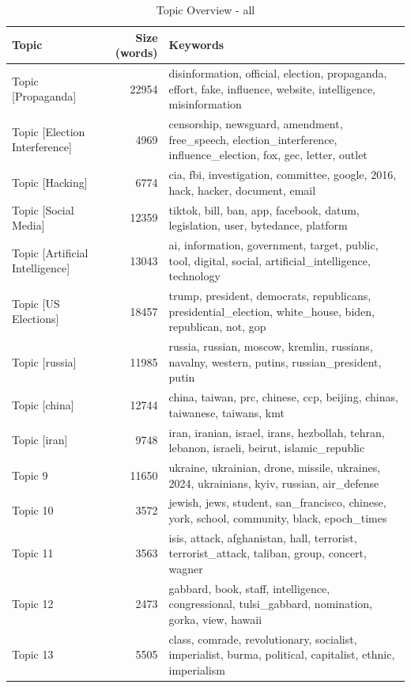 \begin{table}
\centering
\small
\caption{Topic Overview - all}
\label{tab:topic_overview_all}
\begin{tabular}{lrp{8cm}}
\toprule
Topic & Size (words) & Keywords \\
\midrule
Topic [Propaganda] & 22954 & disinformation, official, election, propaganda, effort, fake, influence, website, intelligence, misinformation \\
Topic [Election Interference] & 4969 & censorship, newsguard, amendment, free\_speech, election\_interference, influence\_election, fox, gec, letter, outlet \\
Topic [Hacking] & 6774 & cia, fbi, investigation, committee, google, 2016, hack, hacker, document, email \\
Topic [Social Media] & 12359 & tiktok, bill, ban, app, facebook, datum, legislation, user, bytedance, platform \\
Topic [Artificial Intelligence] & 13043 & ai, information, government, target, public, tool, digital, social, artificial\_intelligence, technology \\
Topic [US Elections] & 18457 & trump, president, democrats, republicans, presidential\_election, white\_house, biden, republican, not, gop \\
Topic [russia] & 11985 & russia, russian, moscow, kremlin, russians, navalny, western, putins, russian\_president, putin \\
Topic [china] & 12744 & china, taiwan, prc, chinese, ccp, beijing, chinas, taiwanese, taiwans, kmt \\
Topic [iran] & 9748 & iran, iranian, israel, irans, hezbollah, tehran, lebanon, israeli, beirut, islamic\_republic \\
Topic 9 & 11650 & ukraine, ukrainian, drone, missile, ukraines, 2024, ukrainians, kyiv, russian, air\_defense \\
Topic 10 & 3572 & jewish, jews, student, san\_francisco, chinese, york, school, community, black, epoch\_times \\
Topic 11 & 3563 & isis, attack, afghanistan, hall, terrorist, terrorist\_attack, taliban, group, concert, wagner \\
Topic 12 & 2473 & gabbard, book, staff, intelligence, congressional, tulsi\_gabbard, nomination, gorka, view, hawaii \\
Topic 13 & 5505 & class, comrade, revolutionary, socialist, imperialist, burma, political, capitalist, ethnic, imperialism \\

\end{tabular}
\end{table}
